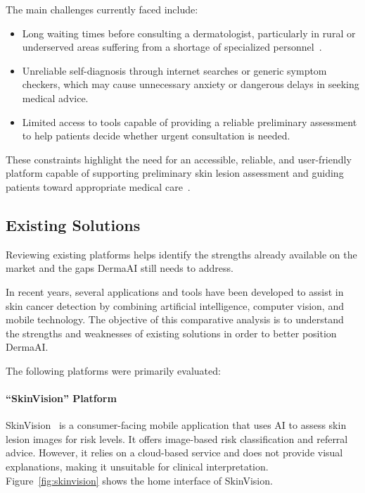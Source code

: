 	The main challenges currently faced include:
	
	\begin{itemize}
	  \item Long waiting times before consulting a dermatologist, particularly in rural
	        or underserved areas suffering from a shortage of specialized
	        personnel~\cite{JAAD2024}.
	  \item Unreliable self-diagnosis through internet searches or generic symptom
	        checkers, which may cause unnecessary anxiety or dangerous delays in
	        seeking medical advice.
	  \item Limited access to tools capable of providing a reliable preliminary
	        assessment to help patients decide whether urgent consultation is needed.
	\end{itemize}
	
	These constraints highlight the need for an accessible, reliable, and user-friendly
	platform capable of supporting preliminary skin lesion assessment and guiding patients
	toward appropriate medical care~\cite{Debelee2023}.
	\subsection{Existing Solutions}
	
	Reviewing existing platforms helps identify the strengths already available on the market
	and the gaps DermaAI still needs to address.
	
	In recent years, several applications and tools have been developed to assist in skin
	cancer detection by combining artificial intelligence, computer vision, and mobile
	technology. The objective of this comparative analysis is to understand the strengths and
	weaknesses of existing solutions in order to better position DermaAI.
	
	The following platforms were primarily evaluated:
	
	\paragraph{``SkinVision'' Platform}
	
	SkinVision~\cite{SkinVision} is a consumer-facing mobile application that uses AI to assess skin lesion images for risk levels. It offers image-based risk classification and referral advice. However, it relies on a cloud-based service and does not provide visual explanations, making it unsuitable for clinical interpretation. Figure~\ref{fig:skinvision} shows the home interface of SkinVision.
	

